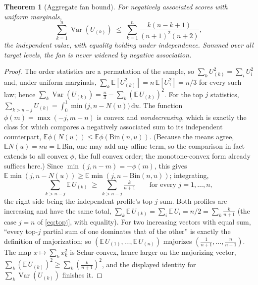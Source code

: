 \documentclass[11pt]{article}
\newtheorem{theorem}{Theorem}
\begin{document}
\begin{theorem}[Aggregate fan bound]\label{thm:agg}
For negatively associated scores with uniform marginals,
\begin{equation}
\sum_{k=1}^n\operatorname{Var}(U_{(k)})\;\le\;\sum_{k=1}^n\frac{k(n-k+1)}{(n+1)^2(n+2)},
\end{equation}
the independent value, with equality holding under independence. Summed over all target levels,
the fan is never widened by negative association.
\end{theorem}

\begin{proof}
The order statistics are a permutation of the sample, so $\sum_k U_{(k)}^2=\sum_i U_i^2$ and, under
uniform marginals, $\sum_k\mathbb E[U_{(k)}^2]=n\,\mathbb E[U_1^2]=n/3$ for every such law; hence
$\sum_k\operatorname{Var}(U_{(k)})=\tfrac n3-\sum_k(\mathbb E\,U_{(k)})^2$. For the top $j$ statistics,
$\sum_{k>n-j}U_{(k)}=\int_0^1\min\!\big(j,n-N(u)\big)\,\mathrm du$. The function $\phi(m)=\max(-j,m-n)$
is convex and \emph{nondecreasing}, which is exactly the class for which \citet{shao2000} compares a
negatively associated sum to its independent counterpart, $\mathbb E\phi(N(u))\le\mathbb E\phi(\mathrm{Bin}(n,u))$.
(Because the means agree, $\mathbb E N(u)=nu=\mathbb E\,\mathrm{Bin}$, one may add any affine term, so
the comparison in fact extends to all convex $\phi$, the full convex order; the monotone-convex form
already suffices here.) Since $\min(j,n-m)=-\phi(m)$, this gives
$\mathbb E\min(j,n-N(u))\ge\mathbb E\min(j,n-\mathrm{Bin}(n,u))$; integrating,
\begin{equation}\label{eq:topj}
\sum_{k>n-j}\mathbb E\,U_{(k)}\;\ge\;\sum_{k>n-j}\tfrac{k}{n+1}\qquad\text{for every }j=1,\dots,n,
\end{equation}
the right side being the independent profile's top-$j$ sum. Both profiles are increasing and have the
same total, $\sum_k\mathbb E\,U_{(k)}=\sum_i\mathbb E\,U_i=n/2=\sum_k\tfrac k{n+1}$ (the case $j=n$ of
\eqref{eq:topj}, with equality). For two increasing vectors with equal sum, ``every top-$j$ partial
sum of one dominates that of the other'' is exactly the definition of majorization; so
$(\mathbb E\,U_{(1)},\dots,\mathbb E\,U_{(n)})$ majorizes $(\tfrac1{n+1},\dots,\tfrac n{n+1})$. The map
$x\mapsto\sum_k x_k^2$ is Schur-convex, hence larger on the majorizing vector,
$\sum_k(\mathbb E\,U_{(k)})^2\ge\sum_k(\tfrac k{n+1})^2$, and the displayed identity for
$\sum_k\operatorname{Var}(U_{(k)})$ finishes it.
\end{proof}
\end{document}
